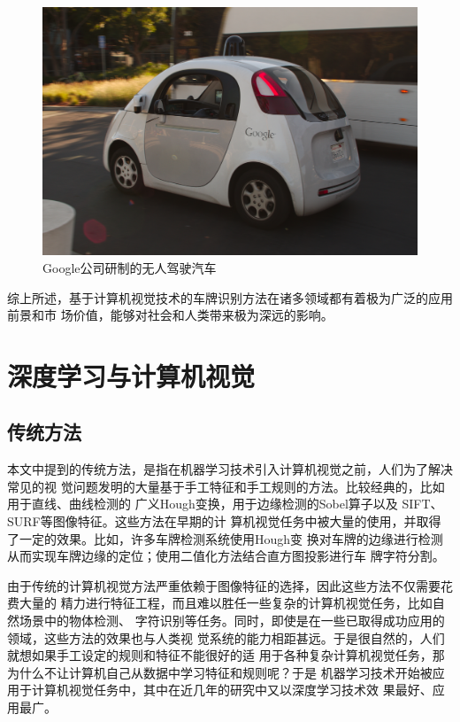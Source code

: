 \begin{figure}[ht]
  \centering
  \includegraphics[width=0.8\linewidth]{./Figure/GoogleSelfDrivingCar.jpg}
  \caption{Google公司研制的无人驾驶汽车}
\end{figure}

综上所述，基于计算机视觉技术的车牌识别方法在诸多领域都有着极为广泛的应用前景和市
场价值，能够对社会和人类带来极为深远的影响。

\section{深度学习与计算机视觉}
\subsection{传统方法}

本文中提到的传统方法，是指在机器学习技术引入计算机视觉之前，人们为了解决常见的视
觉问题发明的大量基于手工特征和手工规则的方法。比较经典的，比如用于直线、曲线检测的
广义Hough变换\cite{Duda:1972eu}，用于边缘检测的Sobel算子以及
SIFT\cite{Lowe:2004kd}、SURF\cite{Baya:2008ud}等图像特征。这些方法在早期的计
算机视觉任务中被大量的使用，并取得了一定的效果。比如，许多车牌检测系统使用Hough变
换对车牌的边缘进行检测从而实现车牌边缘的定位；使用二值化方法结合直方图投影进行车
牌字符分割。

由于传统的计算机视觉方法严重依赖于图像特征的选择，因此这些方法不仅需要花费大量的
精力进行特征工程，而且难以胜任一些复杂的计算机视觉任务，比如自然场景中的物体检测、
字符识别等任务。同时，即使是在一些已取得成功应用的领域，这些方法的效果也与人类视
觉系统的能力相距甚远。于是很自然的，人们就想如果手工设定的规则和特征不能很好的适
用于各种复杂计算机视觉任务，那为什么不让计算机自己从数据中学习特征和规则呢？于是
机器学习技术开始被应用于计算机视觉任务中，其中在近几年的研究中又以深度学习技术效
果最好、应用最广。

